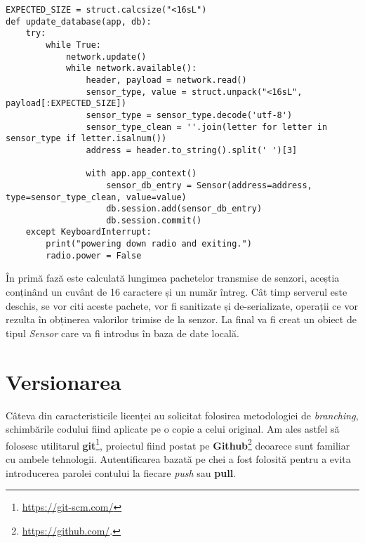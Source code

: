 \begin{lstlisting}[style=python, label=code:db]
EXPECTED_SIZE = struct.calcsize("<16sL")
def update_database(app, db):
	try:
		while True:
			network.update()
			while network.available():
				header, payload = network.read()
				sensor_type, value = struct.unpack("<16sL", payload[:EXPECTED_SIZE])
				sensor_type = sensor_type.decode('utf-8')
				sensor_type_clean = ''.join(letter for letter in sensor_type if letter.isalnum())
				address = header.to_string().split(' ')[3]
				
				with app.app_context()
					sensor_db_entry = Sensor(address=address, type=sensor_type_clean, value=value)
					db.session.add(sensor_db_entry)
					db.session.commit()
	except KeyboardInterrupt:
		print("powering down radio and exiting.")
		radio.power = False
\end{lstlisting}

În primă fază este calculată lungimea pachetelor transmise de senzori, aceștia conținând un cuvânt de 16 caractere și un număr întreg. Cât timp serverul este deschis, se vor citi aceste pachete, vor fi sanitizate și de-serializate, operații ce vor rezulta în obținerea valorilor trimise de la senzor.
La final va fi creat un obiect de tipul \emph{Sensor} care va fi introdus în baza de date locală.


\section{Versionarea}

Câteva din caracteristicile licenței au solicitat folosirea metodologiei de \emph{branching}, schimbările codului fiind aplicate pe o copie a celui original. Am ales astfel să folosesc utilitarul \textbf{git}\footnote{\url{https://git-scm.com/}}, proiectul fiind postat pe \textbf{Github}\footnote{\url{https://github.com/}.} deoarece sunt familiar cu ambele tehnologii. Autentificarea bazată pe chei a fost folosită pentru a evita introducerea parolei contului la fiecare \emph{push} sau \textbf{pull}.